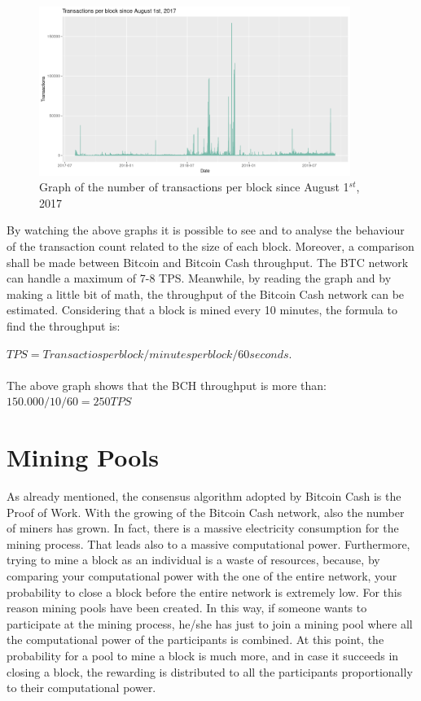 \begin{figure}[h]
    \centering
    \includegraphics[width = 0.9\textwidth]{transactions1.png}
    \caption{Graph of the number of transactions per block since August 1$^{st}$, 2017}
    \label{fig:request}
\end{figure}

By watching the above graphs it is possible to see and to analyse the behaviour of the transaction count
related to the size of each block. Moreover, a comparison shall be made between Bitcoin and Bitcoin Cash throughput.
The BTC network can handle a maximum of 7-8 TPS\cite{thecryptonomist}. Meanwhile, by reading 
the graph and by making a little bit of math, the throughput of the Bitcoin Cash network can be estimated. 
Considering that a block is mined every 10 minutes, the formula to find the throughput is: 

$TPS = Transactios per block / minutes per block / 60 seconds$. \\\\
The above graph shows that the BCH throughput is more than: $150.000 / 10 / 60 = 250 TPS$

\section{Mining Pools}
As already mentioned, the consensus algorithm adopted by Bitcoin Cash is the Proof of Work.
With the growing of the Bitcoin Cash network, also the number of miners has grown. In fact, 
there is a massive electricity consumption for the mining process. That leads also to a 
massive computational power. Furthermore, trying to mine a block as an individual is a waste of
resources, because, by comparing your computational power with the one of the entire network, your
probability to close a block before the entire network is extremely low. For this reason 
mining pools have been created. In this way, if someone wants to participate at the mining process,
he/she has just to join a mining pool where all the computational power of the participants is combined.
At this point, the probability for a pool to mine a block is much more, and in case it succeeds in 
closing a block, the rewarding is distributed to all the participants proportionally to their computational power.\\
\pagebreak

